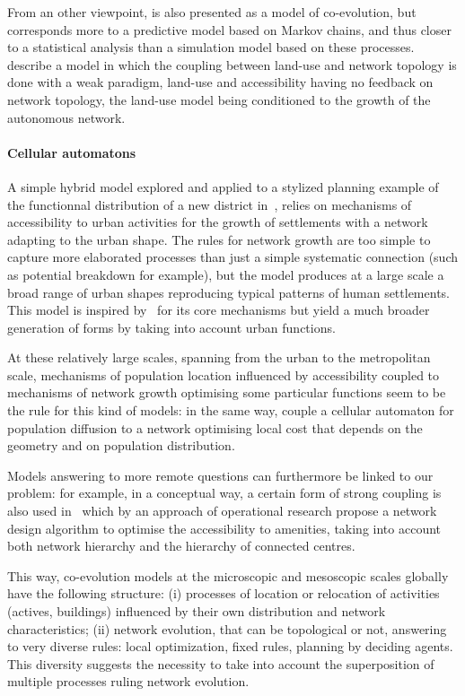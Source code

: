 \documentclass[10pt]{article}
\begin{document}
From an other viewpoint, \cite{levinson2005paving} is also presented as a model of co-evolution, but corresponds more to a predictive model based on Markov chains, and thus closer to a statistical analysis than a simulation model based on these processes. \cite{rui2011urban} describe a model in which the coupling between land-use and network topology is done with a weak paradigm, land-use and accessibility having no feedback on network topology, the land-use model being conditioned to the growth of the autonomous network.



\paragraph{Cellular automatons}

A simple hybrid model explored and applied to a stylized planning example of the functionnal distribution of a new district in~\cite{raimbault2014hybrid}, relies on mechanisms of accessibility to urban activities for the growth of settlements with a network adapting to the urban shape. The rules for network growth are too simple to capture more elaborated processes than just a simple systematic connection (such as potential breakdown for example), but the model produces at a large scale a broad range of urban shapes reproducing typical patterns of human settlements. This model is inspired by~\cite{moreno2012automate} for its core mechanisms but yield a much broader generation of forms by taking into account urban functions.

At these relatively large scales, spanning from the urban to the metropolitan scale, mechanisms of population location influenced by accessibility coupled to mechanisms of network growth optimising some particular functions seem to be the rule for this kind of models: in the same way, \cite{wu2017city} couple a cellular automaton for population diffusion to a network optimising local cost that depends on the geometry and on population distribution.

Models answering to more remote questions can furthermore be linked to our problem: for example, in a conceptual way, a certain form of strong coupling is also used in~\cite{bigotte2010integrated} which by an approach of operational research propose a network design algorithm to optimise the accessibility to amenities, taking into account both network hierarchy and the hierarchy of connected centres.


This way, co-evolution models at the microscopic and mesoscopic scales globally have the following structure: (i) processes of location or relocation of activities (actives, buildings) influenced by their own distribution and network characteristics; (ii) network evolution, that can be topological or not, answering to very diverse rules: local optimization, fixed rules, planning by deciding agents. This diversity suggests the necessity to take into account the superposition of multiple processes ruling network evolution.
\end{document}
